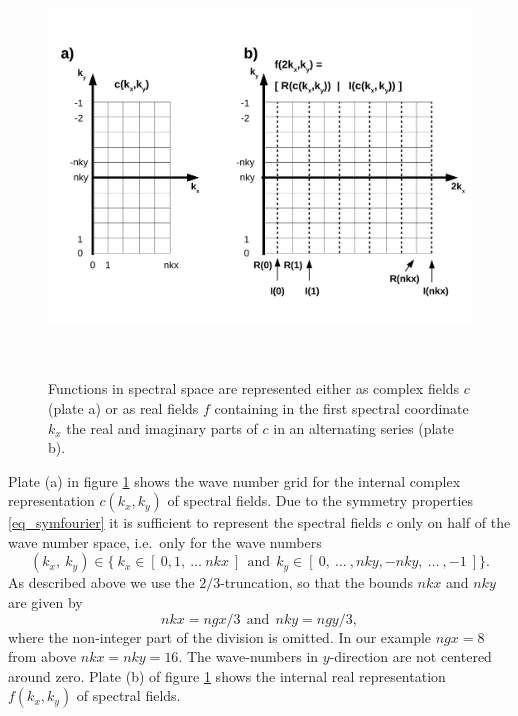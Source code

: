 \begin{figure}
   \includegraphics[height=11cm]{figures/cmplx_real_spec_grid.pdf}
   \caption{Functions in spectral space are represented either as
            complex fields $c$ (plate a) or as real fields $f$ containing
            in the first spectral coordinate $k_{x}$ the real and
            imaginary parts of $c$ in an alternating series (plate b).}
   \label{fig_ctorspecgrid}
\end{figure}
Plate (a) in figure \ref{fig_ctorspecgrid} shows the wave number
grid for the internal complex representation $c(k_{x},k_{y})$
of spectral fields. Due to the symmetry properties \ref{eq_symfourier}
it is sufficient to represent the spectral fields $c$ only on half of
the wave number space, i.e.\ only for the wave numbers
\begin{equation} \label{eq_ncentwgrid}
   (k_{x},\ k_{y}) \in  
   \{\ k_{x} \in [\ 0,1,\ \dots \ nkx \ ] \ \ \mbox{and} \ \ 
   k_{y} \in [\ 0, \ \dots \ ,nky,-nky, \ \dots \ , -1 \ ] \}.
\end{equation}
As described above we use the $2/3$-truncation, so that the bounds
$nkx$ and $nky$ are given by
\begin{equation} \label{eq_nkxnky}
   nkx = ngx/3 \ \ \mbox{and} \ \ nky = ngy/3,
\end{equation}
where the non-integer part of the division is omitted. In our example
$ngx=8$ from above $nkx = nky = 16$. The wave-numbers in $y$-direction
are not centered around zero. Plate (b) of figure \ref{fig_ctorspecgrid}
shows the internal real representation $f(k_{x},k_{y})$ of spectral fields.
